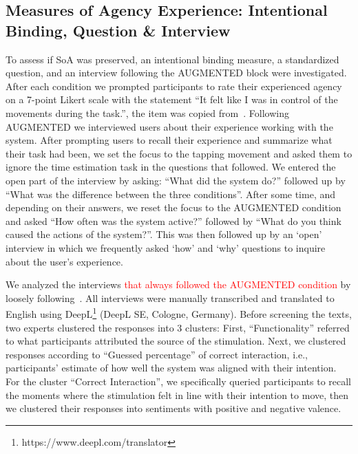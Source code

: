 \subsection{Measures of Agency Experience: Intentional Binding, Question \& Interview}
To assess if SoA was preserved, an intentional binding measure, a standardized question, and an interview following the AUGMENTED block were investigated. After each condition we prompted participants to rate their experienced agency on a 7-point Likert scale with the statement ``It felt like I was in control of the movements during the task.'', the item was copied from~\cite{Bergstrom2022-fb}. Following AUGMENTED we interviewed users about their experience working with the system. After prompting users to recall their experience and summarize what their task had been, we set the focus to the tapping movement and asked them to ignore the time estimation task in the questions that followed. We entered the open part of the interview by asking: ``What did the system do?'' followed up by ``What was the difference between the three conditions''. After some time, and depending on their answers, we reset the focus to the AUGMENTED condition and asked ``How often was the system active?'' followed by ``What do you think caused the actions of the system?''. This was then followed up by an `open' interview in which we frequently asked `how' and `why' questions to inquire about the user's experience.

We analyzed the interviews \textcolor{red}{that always followed the AUGMENTED condition} by loosely following~\citet{Mayring2015-pp}. All interviews were manually transcribed and translated to English using DeepL\footnote{https://www.deepl.com/translator} (DeepL SE, Cologne, Germany). Before screening the texts, two experts clustered the responses into 3 clusters: First, ``Functionality'' referred to what participants attributed the source of the stimulation. Next, we clustered responses according to ``Guessed percentage'' of correct interaction, i.e., participants' estimate of how well the system was aligned with their intention. For the cluster ``Correct Interaction'', we specifically queried participants to recall the moments where the stimulation felt in line with their intention to move, then we clustered their responses into sentiments with positive and negative valence. 

